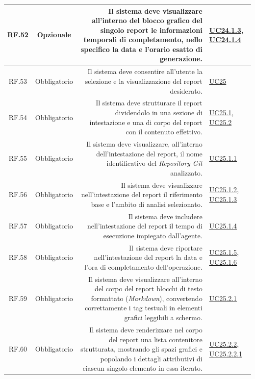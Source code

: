 \documentclass[12pt, a4paper]{article}
\begin{document}
\begin{xltabular}{\textwidth}{|c|c|D|F|}
    RF.52 & Opzionale & Il sistema deve visualizzare all'interno del blocco grafico del singolo report le informazioni temporali di completamento, nello specifico la data e l'orario esatto di generazione. & \hyperref[uc:24.1.3]{UC24.1.3}, \hyperref[uc:24.1.4]{UC24.1.4} \\ \hline

    RF.53 & Obbligatorio & Il sistema deve consentire all'utente la selezione e la visualizzazione del report desiderato. & \hyperref[uc:25]{UC25} \\ \hline
    
    RF.54 & Obbligatorio & Il sistema deve strutturare il report dividendolo in una sezione di intestazione e una di corpo del report con il contenuto effettivo. & \hyperref[uc:25.1]{UC25.1}, \hyperref[uc:25.2]{UC25.2} \\ \hline
    
    RF.55 & Obbligatorio & Il sistema deve visualizzare, all'interno dell'intestazione del report, il nome identificativo del \textit{Repository Git} analizzato. & \hyperref[uc:25.1.1]{UC25.1.1} \\ \hline
    
    RF.56 & Obbligatorio & Il sistema deve visualizzare nell'intestazione del report il riferimento base e l'ambito di analisi selezionato. & \hyperref[uc:25.1.2]{UC25.1.2}, \hyperref[uc:25.1.3]{UC25.1.3} \\ \hline
    
    RF.57 & Obbligatorio & Il sistema deve includere nell'intestazione del report il tempo di esecuzione impiegato dall'agente. & \hyperref[uc:25.1.4]{UC25.1.4} \\ \hline
    
    RF.58 & Obbligatorio & Il sistema deve riportare nell'intestazione del report la data e l'ora di completamento dell'operazione. & \hyperref[uc:25.1.5]{UC25.1.5}, \hyperref[uc:25.1.6]{UC25.1.6} \\ \hline

    RF.59 & Obbligatorio & Il sistema deve visualizzare all'interno del corpo del report blocchi di testo formattato (\textit{Markdown}), convertendo correttamente i tag testuali in elementi grafici leggibili a schermo. & \hyperref[uc:25.2.1]{UC25.2.1} \\ \hline
    
    RF.60 & Obbligatorio & Il sistema deve renderizzare nel corpo del report una lista contenitore strutturata, mostrando gli spazi grafici e popolando i dettagli attributivi di ciascun singolo elemento in essa iterato. & \hyperref[uc:25.2.2]{UC25.2.2}, \hyperref[uc:25.2.2.1]{UC25.2.2.1} \\ \hline
    

\end{xltabular}
\end{document}
